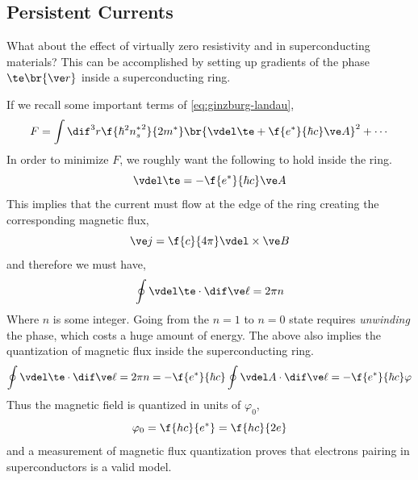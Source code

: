 \documentclass{article}
\newcommand{\vp}{\varphi}
\begin{document}
\subsection{Persistent Currents}
What about the effect of virtually zero resistivity and  in superconducting materials? This can be accomplished by setting up gradients of the phase $\te \br{\ve r}$ inside a superconducting ring.
\begin{center}
\end{center}
If we recall some important terms of \cref{eq:ginzburg-landau},
\[ F = \int \dif^3 r \f{\hbar^2 {n_s^*}^2}{2 m^*} \br{\vdel \te + \f{e^*}{\hbar c} \ve A}^2 + \cdots \]
In order to minimize $F$, we roughly want the following to hold inside the ring.
\[ \vdel \te = -\f{e^*}{\hbar c}\ve A\]
This implies that the current must flow at the edge of the ring creating the corresponding magnetic flux,
\[ \ve j = \f{c}{4\pi} \vdel \times \ve B \]
and therefore we must have,
\[ \oint \vdel \te \cdot \dif \ve \ell = 2 \pi n \]
Where $n$ is some integer. Going from the $n=1$ to $n=0$ state requires \textit{unwinding} the phase, which costs a huge amount of energy. The above also implies the quantization of magnetic flux inside the superconducting ring.
\[ \oint \vdel \te \cdot \dif \ve \ell = 2 \pi n = - \f{e^*}{\hbar c}\oint \vdel A \cdot \dif \ve \ell = - \f{e^*}{\hbar c} \vp \]
Thus the magnetic field is quantized in units of $\vp_0$,
\[ \vp_0 = \f{hc}{e^*} = \f{hc}{2e} \]
and a measurement of magnetic flux quantization proves that electrons pairing in superconductors is a valid model.
\end{document}
